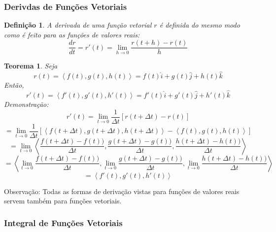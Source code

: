 \documentclass[a4paper,12pt]{article}
\begin{document}
    \subsubsection{Derivdas de Funções Vetoriais}
        \newtheorem{definition}{Definição}
            \begin{definition}
                A derivada de uma função vetorial $r$ é definida do mesmo modo como é feito para as funções de valores reais:
                \[\dfrac{dr}{dt} = r'(t) = \lim_{h \to 0} \frac{r(t + h) - r(t)}{h}\]
            \end{definition}
        \newtheorem{theorem}{Teorema}
            \begin{theorem}
                Seja \[r(t) = \left<f(t), g(t), h(t)\right> = f(t)\hat{i} + g(t)\hat{j} + h(t)\hat{k}\]
                Então, \[r'(t) = \left<f'(t), g'(t), h'(t)\right> = f'(t)\hat{i} + g'(t)\hat{j} + h'(t)\hat{k}\]
                Demonstração:
                \[r'(t) = \lim_{t \to 0} \frac{1}{\Delta t}[r(t + \Delta t) - r(t)]\]
                \[ = \lim_{t \to 0} \frac{1}{\Delta t}[\left<f(t + \Delta t), g(t + \Delta t), h(t + \Delta t)\right> - \left<f(t), g(t), h(t)\right>]\]
                \[ = \lim_{t \to 0} \left< \dfrac{f(t + \Delta t) - f(t))}{\Delta t}, \dfrac{g(t + \Delta t) - g(t))}{\Delta t}, \dfrac{h(t + \Delta t) - h(t))}{\Delta t}\right>\]
                \[ = \left< \lim_{t \to 0} \dfrac{f(t + \Delta t) - f(t))}{\Delta t}, \lim_{t \to 0} \dfrac{g(t + \Delta t) - g(t))}{\Delta t}, \lim_{t \to 0} \dfrac{h(t + \Delta t) - h(t))}{\Delta t}\right>\]
                \[= \left<f'(t), g'(t), h'(t)\right>\]
            \end{theorem}
    Observação: Todas as formas de derivação vistas para funções de valores reais servem também para funções vetoriais.
\newpage
    \subsubsection{Integral de Funções Vetoriais}
\end{document}
